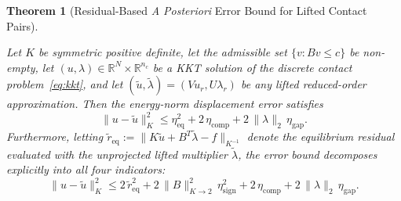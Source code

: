 \documentclass[11pt,a4paper]{article}
\newtheorem{theorem}{Theorem}
\begin{document}
\begin{theorem}[Residual-Based \emph{A Posteriori} Error Bound for Lifted Contact Pairs]\label{thm:bound}

Let \(K\) be symmetric positive definite, let the admissible set \(\{v : B v \le c\}\) be non-empty, let \((u, \lambda) \in \mathbb{R}^N \times \mathbb{R}^{n_c}\) be a KKT solution of the discrete contact problem~\eqref{eq:kkt}, and let \((\tilde{u}, \tilde{\lambda}) = (V u_r, U \lambda_r)\) be any lifted reduced-order approximation. Then the energy-norm displacement error satisfies
\begin{equation}\label{eq:bound1}
\|u - \tilde{u}\|_K^2 \le \eta_{\mathrm{eq}}^2 + 2\,\eta_{\mathrm{comp}} + 2\,\|\lambda\|_2\,\eta_{\mathrm{gap}}.
\end{equation}
Furthermore, letting \(\tilde{r}_{\mathrm{eq}} := \|K \tilde{u} + B^T \tilde{\lambda} - f\|_{K^{-1}}\) denote the equilibrium residual evaluated with the unprojected lifted multiplier \(\tilde{\lambda}\), the error bound decomposes explicitly into all four indicators:
\begin{equation}\label{eq:bound2}
\|u - \tilde{u}\|_K^2 \le 2\,\tilde{r}_{\mathrm{eq}}^2 + 2\,\|B\|_{K \to 2}^2\,\eta_{\mathrm{sign}}^2 + 2\,\eta_{\mathrm{comp}} + 2\,\|\lambda\|_2\,\eta_{\mathrm{gap}}.
\end{equation}

\end{theorem}
\end{document}
